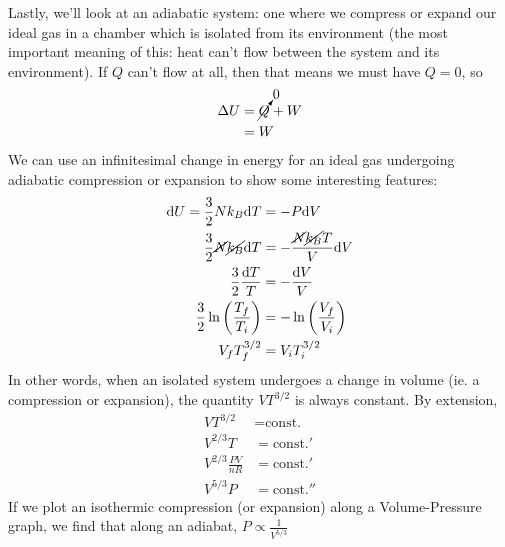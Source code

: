 \documentclass[a4paper]{article}
\begin{document}
Lastly, we'll look at an adiabatic system: one where we compress or expand
our ideal gas in a chamber which is isolated from its environment (the most
important meaning of this: heat can't flow between the system and its
environment). If $Q$ can't flow at all, then that means we must have $Q=0$, so
\begin{align*}
	\Delta U &= \cancelto{0}{Q} + W\\
		 &= W
\end{align*}
We can use an infinitesimal change in energy for an ideal gas undergoing
adiabatic compression or expansion to show some interesting features:
\begin{align*}
	\mathrm{d} U = \frac32 N k_B \mathrm{d} T &= -P\mathrm{d} V\\
	\frac32 \cancel{N}\cancel{k_B}\mathrm{d} T &= -\frac{\cancel{N}\cancel{k_B}T}
		{V}\mathrm{d} V\\
	\frac32 \frac{\mathrm{d} T}{T} &= -\frac{\mathrm{d} V}{V}\\
	\frac32 \ln\left(\frac{T_f}{T_i}\right) &=
		-\ln\left(\frac{V_f}{V_i}\right)\\
	V_fT_f^{3/2} &= V_iT_i^{3/2}
\end{align*}
In other words, when an isolated system undergoes a change in volume (ie.
a compression or expansion), the quantity $VT^{3/2}$ is always constant.
By extension,
\begin{align*}
	VT^{3/2} &= \text{const.}\\
	V^{2/3}T &= \text{const.}'\\
	V^{2/3}\frac{PV}{nR} &= \text{const.}'\\
	V^{5/3}P &= \text{const.}''
\end{align*}
If we plot an isothermic compression (or expansion) along a Volume-Pressure
graph, we find that along an adiabat, $P\propto\frac{1}{V^{5/3}}$

\begin{center}
\end{center}
\end{document}
